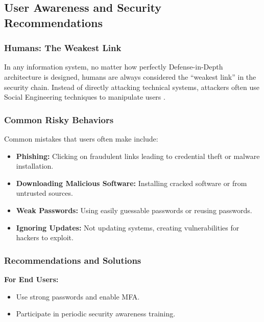 \subsection{User Awareness and Security Recommendations}

\subsubsection{Humans: The Weakest Link}

In any information system, no matter how perfectly Defense-in-Depth architecture is designed, humans are always considered the ``weakest link'' in the security chain. Instead of directly attacking technical systems, attackers often use Social Engineering techniques to manipulate users \cite{ref1}.

\subsubsection{Common Risky Behaviors}

Common mistakes that users often make include:

\begin{itemize}
    \item \textbf{Phishing:} Clicking on fraudulent links leading to credential theft or malware installation.
    
    \item \textbf{Downloading Malicious Software:} Installing cracked software or from untrusted sources.
    
    \item \textbf{Weak Passwords:} Using easily guessable passwords or reusing passwords.
    
    \item \textbf{Ignoring Updates:} Not updating systems, creating vulnerabilities for hackers to exploit.
\end{itemize}

\subsubsection{Recommendations and Solutions}

\textbf{For End Users:}
\begin{itemize}
    \item Use strong passwords and enable MFA.
    \item Participate in periodic security awareness training.
\end{itemize}

